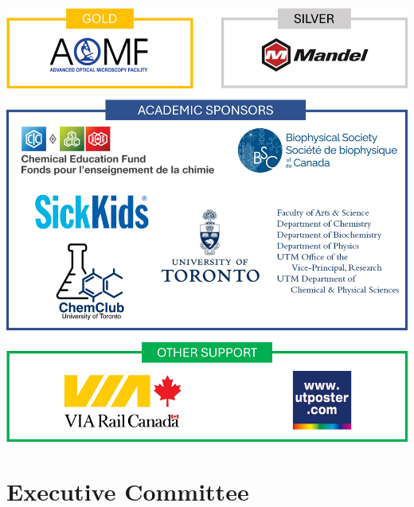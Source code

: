 \documentclass[titlepage,oneside,openany,10pt]{book}
\begin{document}
\begin{center}%
	\includegraphics[width=\textwidth,keepaspectratio]{Other_Figures/sponsors_withtiers.jpg}
\end{center}


\chapter*{Executive Committee}
\label{chapter:executive_committee}  
  
\end{document}

